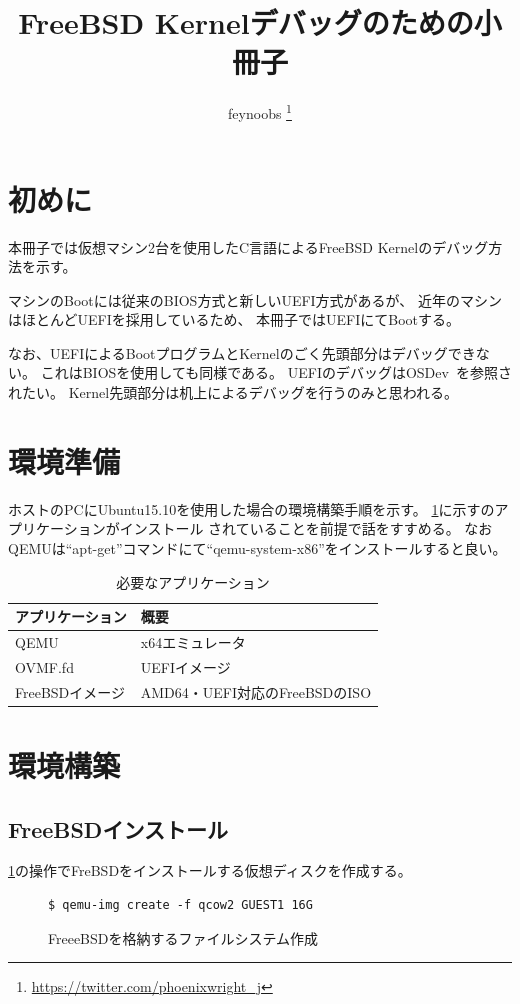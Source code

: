 \documentclass[a4j]{jarticle}
\title{FreeBSD Kernelデバッグのための小冊子}
\author{feynoobs \thanks{\protect\url{https://twitter.com/phoenixwright_j}}}
\begin{document}
\maketitle

\tableofcontents

\newpage

\section{初めに}
本冊子では仮想マシン2台を使用したC言語によるFreeBSD Kernelのデバッグ方法を示す。

マシンのBootには従来のBIOS方式と新しいUEFI方式があるが、
近年のマシンはほとんどUEFIを採用しているため、
本冊子ではUEFIにてBootする。

なお、UEFIによるBootプログラムとKernelのごく先頭部分はデバッグできない。
これはBIOSを使用しても同様である。
UEFIのデバッグはOSDev~\cite{OSDev}を参照されたい。
Kernel先頭部分は机上によるデバッグを行うのみと思われる。

\section{環境準備}
ホストのPCにUbuntu15.10を使用した場合の環境構築手順を示す。
\ref{tb:FreeBSD:_ENV}に示すのアプリケーションがインストール
されていることを前提で話をすすめる。
なおQEMUは``apt-get''コマンドにて``qemu-system-x86''をインストールすると良い。
\begin{table}[htp]
	\caption{必要なアプリケーション}
	\label{tb:FreeBSD:_ENV}
	\centering
	\begin{tabular}{|l|p{10cm}|}									\hline
		アプリケーション	&	概要							\\	\hline	\hline
		QEMU				&	x64エミュレータ				\\	\hline
		OVMF.fd				&	UEFIイメージ					\\	\hline
		FreeBSDイメージ		&	AMD64・UEFI対応のFreeBSDのISO	\\	\hline
	\end{tabular}
\end{table}

\section{環境構築}
\subsection{FreeBSDインストール}
\label{sec:FreeBSD_inst}
\ref{fig:FreeBSD_CREATE}の操作でFreBSDをインストールする仮想ディスクを作成する。
\begin{figure}[htbp]
	\centering
	\begin{lstlisting}[basicstyle=\ttfamily\footnotesize, frame=single, breaklines=true]
$ qemu-img create -f qcow2 GUEST1 16G
	\end{lstlisting}
	\caption{FreeeBSDを格納するファイルシステム作成}
	\label{fig:FreeBSD_CREATE}
\end{figure}
\end{document}
